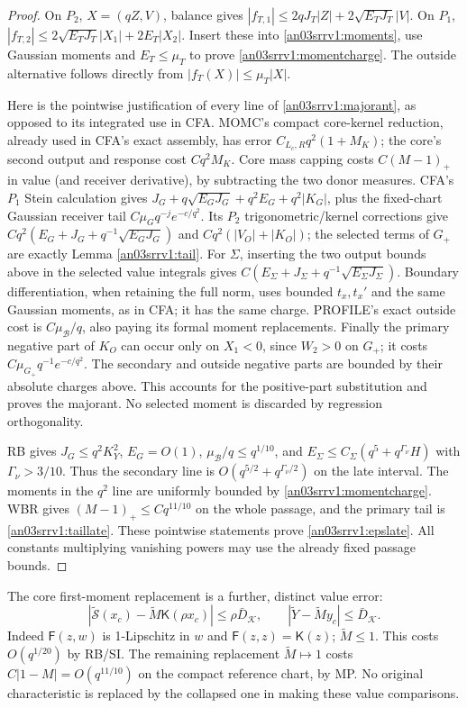 \documentclass[11pt]{article}
\numberwithin{equation}{section}
\theoremstyle{remark}\newtheorem{remark}[theorem]{Remark}
\newcommand{\KK}{\mathcal K}\newcommand{\BB}{\mathcal B}
\newcommand{\Gp}{{G_+}}\newcommand{\eps}{\varepsilon}
\newcommand{\Kfun}{\mathsf K}\newcommand{\Ffun}{\mathsf F}
\begin{document}
\begin{proof}
On $P_2$, $X=(qZ,V)$, balance gives
$|f_{T,1}|\le2qJ_T|Z|+2\sqrt{E_TJ_T}|V|$.
On $P_1$, $|f_{T,2}|\le2\sqrt{E_TJ_T}|X_1|+2E_T|X_2|$.
Insert these into \eqref{an03srrv1:moments}, use Gaussian moments
and $E_T\le\mu_T$ to prove \eqref{an03srrv1:momentcharge}.
The outside alternative follows directly from $|f_T(X)|\le\mu_T|X|$.

Here is the pointwise justification of every line of
\eqref{an03srrv1:majorant}, as opposed to its integrated use in CFA.
MOMC's compact core-kernel reduction, already used in CFA's exact
assembly, has error $C_{L_c,R}q^2(1+M_K)$; the core's second
output and response cost $Cq^2M_K$. Core mass capping costs
$C(M-1)_+$ in value (and receiver derivative), by subtracting
the two donor measures. CFA's $P_1$ Stein calculation gives
$J_G+q\sqrt{E_GJ_G}+q^2E_G+q^2|K_G|$, plus the fixed-chart
Gaussian receiver tail $C\mu_Gq^{-j}e^{-c/q^2}$.
Its $P_2$ trigonometric/kernel corrections give
$Cq^2(E_G+J_G+q^{-1}\sqrt{E_GJ_G})$ and
$Cq^2(|V_O|+|K_O|)$; the selected terms of $\Gp$ are exactly
Lemma \ref{an03srrv1:tail}. For $\Sigma$, inserting the two output
bounds above in the selected value integrals gives
$C(E_\Sigma+J_\Sigma+q^{-1}\sqrt{E_\Sigma J_\Sigma})$.
Boundary differentiation, when retaining the full norm, uses bounded
$t_x,t_x'$ and the same Gaussian moments, as in CFA; it has the
same charge. PROFILE's exact outside cost is $C\mu_\BB/q$,
also paying its formal moment replacements. Finally the primary
negative part of $K_O$ can occur only on $X_1<0$, since $W_2>0$
on $\Gp$; it costs $C\mu_\Gp q^{-1}e^{-c/q^2}$.
The secondary and outside negative parts are bounded by their
absolute charges above. This accounts for the positive-part
substitution and proves the majorant. No selected moment is
discarded by regression orthogonality.

RB gives $J_G\le q^2K_Y^2$, $E_G=O(1)$,
$\mu_\BB/q\le q^{1/10}$, and
$E_\Sigma\le C_\Sigma(q^5+q^{\Gamma_\nu}H)$ with
$\Gamma_\nu>3/10$. Thus the secondary line is
$O(q^{5/2}+q^{\Gamma_\nu/2})$ on the late interval.
The moments in the $q^2$ line are uniformly bounded by
\eqref{an03srrv1:momentcharge}. WBR gives
$(M-1)_+\le Cq^{11/10}$ on the whole passage, and the primary
tail is \eqref{an03srrv1:taillate}. These pointwise statements
prove \eqref{an03srrv1:epslate}. All constants multiplying vanishing
powers may use the already fixed passage bounds.
\end{proof}

The core first-moment replacement is a further, distinct value error:
\begin{equation}
 |\widetilde{\mathcal S}(x_c)-\widetilde M\Kfun(\rho x_c)|
 \le\rho\bar D_\KK,\qquad
 |\widetilde Y-\widetilde M y_c|\le\bar D_\KK.
 \label{an03srrv1:corecollapse}
\end{equation}
Indeed $\Ffun(z,w)$ is 1-Lipschitz in $w$ and
$\Ffun(z,z)=\Kfun(z)$; $\widetilde M\le1$.
This costs $O(q^{1/20})$ by RB/SI. The remaining replacement
$\widetilde M\mapsto1$ costs $C|1-M|=O(q^{11/10})$ on the
compact reference chart, by MP. No original characteristic is
replaced by the collapsed one in making these value comparisons.
\end{document}
